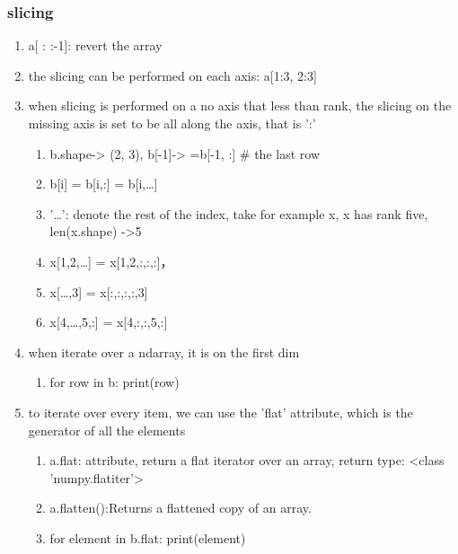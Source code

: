 \documentclass[11pt]{article}
\begin{document}
\subsubsection{slicing}
\label{sec:org7858e6f}
\begin{enumerate}
\item a[ : :-1]: revert the array
\label{sec:org3668499}
\item the slicing can be performed on each axis: a[1:3, 2:3]
\label{sec:org4b1bc88}
\item when slicing is performed on a no axis that less than rank, the slicing on the missing axis is set to be all along the axis, that is ':'
\label{sec:org0738e16}
\begin{enumerate}
\item b.shape-> (2, 3), b[-1]-> =b[-1, :] \# the last row
\label{sec:org7fb1cb5}
\item b[i] = b[i,:] = b[i,\ldots{}]
\label{sec:org727aaaf}
\item '\ldots{}': denote the rest of the index, take for example x, x has rank five, len(x.shape) ->5
\label{sec:org7a312a5}
\item x[1,2,\ldots{}] = x[1,2,:,:,:]，
\label{sec:org76a0fbf}
\item x[\ldots{},3] = x[:,:,:,:,3]
\label{sec:org2004d96}
\item x[4,\ldots{},5,:] = x[4,:,:,5,:]
\label{sec:orgadae4ee}
\end{enumerate}
\item when iterate over a ndarray, it is on the first dim
\label{sec:orgfcc5a8c}
\begin{enumerate}
\item for row in b: print(row)
\label{sec:org8b347a2}
\end{enumerate}
\item to iterate over every item, we can use the 'flat' attribute, which is the generator of all the elements
\label{sec:org2adf4c2}
\begin{enumerate}
\item a.flat: attribute, return a flat iterator over an array, return type: <class 'numpy.flatiter'>
\label{sec:org3879590}
\item a.flatten():Returns a flattened copy of an array.
\label{sec:orge6fc069}
\item for element in b.flat: print(element)
\label{sec:orge131d8f}
\end{enumerate}
\end{enumerate}
\end{document}
